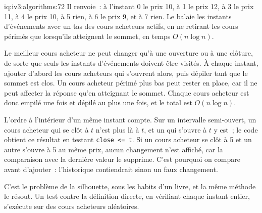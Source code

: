 \begin{solution}{iq:iv3:algorithms:72}
Il renvoie~: à l'instant 0 le prix 10, à 1 le prix 12, à 3 le prix 11, à 4 le prix 10, à 5 rien, à 6 le prix 9, et à 7 rien. Le  balaie les instants d'événements avec un tas des cours acheteurs actifs, en ne retirant les cours périmés que lorsqu'ils atteignent le sommet, en temps $O(n \log n)$.
\enlargethispage{-3\baselineskip}%
\label{lst:iv3:al:bidhistory}

Le meilleur cours acheteur ne peut changer qu'à une ouverture ou à une clôture, de sorte que seuls les instants d'événements doivent être visités. À chaque instant, ajouter d'abord les cours acheteurs qui s'ouvrent alors, puis dépiler tant que le sommet est clos. Un cours acheteur périmé plus bas peut rester en place, car il ne peut affecter la réponse qu'en atteignant le sommet. Chaque cours acheteur est donc empilé une fois et dépilé au plus une fois, et le total est $O(n \log n)$.

L'ordre à l'intérieur d'un même instant compte. Sur un intervalle semi-ouvert, un cours acheteur qui se clôt à $t$ n'est plus là à $t$, et un qui s'ouvre à $t$ y est~; le code obtient ce résultat en testant \texttt{close <= t}. Si un cours acheteur se clôt à 5 et un autre s'ouvre à 5 au même prix, aucun changement n'est affiché, car la comparaison avec la dernière valeur le supprime. C'est pourquoi on compare avant d'ajouter~: l'historique contiendrait sinon un faux changement.

C'est le problème de la silhouette, sous les habits d'un livre, et la même méthode le résout. Un test contre la définition directe, en vérifiant chaque instant entier, s'exécute sur des cours acheteurs aléatoires.

\end{solution}


